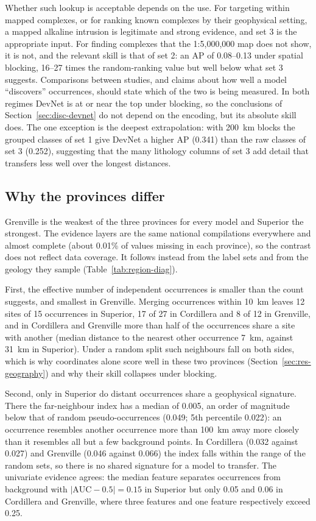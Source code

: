 \documentclass[pdflatex,sn-apa]{sn-jnl}
\begin{document}
Whether such lookup is acceptable depends on the use. For targeting within mapped complexes, or for ranking known complexes by their geophysical setting, a mapped alkaline intrusion is legitimate and strong evidence, and set 3 is the appropriate input. For finding complexes that the 1:5,000,000 map does not show, it is not, and the relevant skill is that of set 2: an AP of 0.08--0.13 under spatial blocking, 16--27 times the random-ranking value but well below what set 3 suggests. Comparisons between studies, and claims about how well a model ``discovers'' occurrences, should state which of the two is being measured. In both regimes DevNet is at or near the top under blocking, so the conclusions of Section~\ref{sec:disc-devnet} do not depend on the encoding, but its absolute skill does. The one exception is the deepest extrapolation: with 200~km blocks the grouped classes of set 1 give DevNet a higher AP (0.341) than the raw classes of set 3 (0.252), suggesting that the many lithology columns of set 3 add detail that transfers less well over the longest distances.

\subsection{Why the provinces differ}\label{sec:disc-provinces}

Grenville is the weakest of the three provinces for every model and Superior the strongest. The evidence layers are the same national compilations everywhere and almost complete (about 0.01\% of values missing in each province), so the contrast does not reflect data coverage. It follows instead from the label sets and from the geology they sample (Table~\ref{tab:region-diag}).

First, the effective number of independent occurrences is smaller than the count suggests, and smallest in Grenville. Merging occurrences within 10~km leaves 12 sites of 15 occurrences in Superior, 17 of 27 in Cordillera and 8 of 12 in Grenville, and in Cordillera and Grenville more than half of the occurrences share a site with another (median distance to the nearest other occurrence 7~km, against 31~km in Superior). Under a random split such neighbours fall on both sides, which is why coordinates alone score well in these two provinces (Section~\ref{sec:res-geography}) and why their skill collapses under blocking.

Second, only in Superior do distant occurrences share a geophysical signature. There the far-neighbour index has a median of 0.005, an order of magnitude below that of random pseudo-occurrences (0.049; 5th percentile 0.022): an occurrence resembles another occurrence more than 100~km away more closely than it resembles all but a few background points. In Cordillera (0.032 against 0.027) and Grenville (0.046 against 0.066) the index falls within the range of the random sets, so there is no shared signature for a model to transfer. The univariate evidence agrees: the median feature separates occurrences from background with $|\mathrm{AUC}-0.5| = 0.15$ in Superior but only 0.05 and 0.06 in Cordillera and Grenville, where three features and one feature respectively exceed 0.25.
\end{document}
